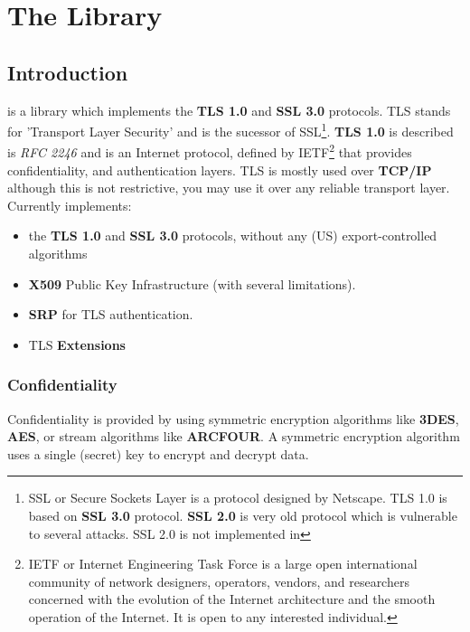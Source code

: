 \documentclass{book}
\begin{document}




\tableofcontents
\newpage
{}
\pagestyle{fancy}

\chapter{The Library}
\section{Introduction}
\par
\gnutls is a library which implements the {\bf TLS 1.0} and {\bf SSL 3.0} protocols.
TLS stands for 'Transport Layer Security' and is the sucessor of SSL\footnote{
SSL or Secure Sockets Layer is a protocol designed by Netscape. TLS 1.0 is based on
{\bf SSL 3.0} protocol. {\bf SSL 2.0} is very old protocol which is vulnerable to several attacks. SSL 2.0 is not
implemented in \gnutls}.
{\bf TLS 1.0} is described is {\it RFC 2246} and is an Internet protocol,
defined by IETF\footnote{IETF or Internet Engineering Task Force 
is a large open international community of network
designers, operators, vendors, and researchers concerned with the evolution of 
the Internet architecture and the smooth operation of the Internet. It is open to any interested individual.}
that provides confidentiality, and authentication layers. 
TLS is mostly used over {\bf TCP/IP} although this is not restrictive, you may
use it over any reliable transport layer.
Currently \gnutls implements:
\begin{itemize}
 \item the {\bf TLS 1.0} and {\bf{ SSL 3.0}} protocols, without any (US) export-controlled algorithms
 \item {\bf X509} Public Key Infrastructure (with several limitations).
 \item {\bf SRP} for TLS authentication.
 \item TLS {\bf Extensions}
\end{itemize}

\subsection{Confidentiality}
\par
Confidentiality is provided by using symmetric encryption algorithms like {\bf 3DES}, {\bf AES}, or
stream algorithms like {\bf ARCFOUR}. A symmetric encryption algorithm uses a single (secret) key
to encrypt and decrypt data.
\end{document}
